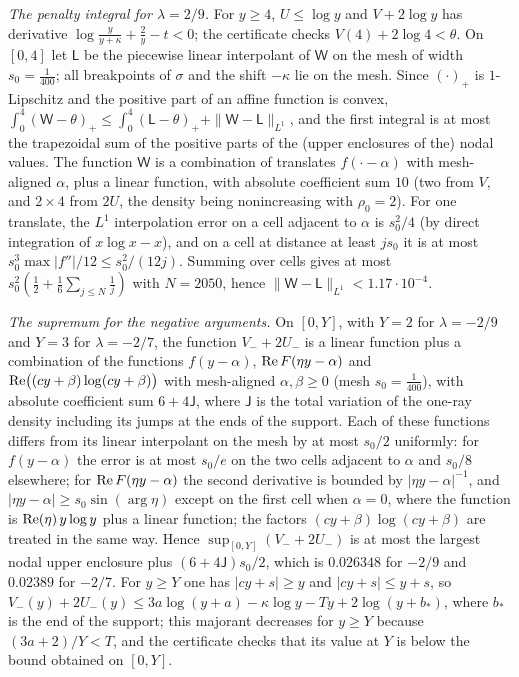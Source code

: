 \emph{The penalty integral for $\lambda=2/9$.} For $y\ge4$, $U\le\log y$ and $V+2\log y$ has derivative $\log\frac y{y+\kappa}+\frac2y-t<0$; the certificate checks $V(4)+2\log4<\theta$. On $[0,4]$ let $\mathsf L$ be the piecewise linear interpolant of $\mathsf W$ on the mesh of width $s_0=\frac1{400}$; all breakpoints of $\sigma$ and the shift $-\kappa$ lie on the mesh. Since $(\cdot)_+$ is $1$-Lipschitz and the positive part of an affine function is convex, $\int_0^4(\mathsf W-\theta)_+\le\int_0^4(\mathsf L-\theta)_++\|\mathsf W-\mathsf L\|_{L^1}$, and the first integral is at most the trapezoidal sum of the positive parts of the (upper enclosures of the) nodal values. The function $\mathsf W$ is a combination of translates $f(\cdot-\alpha)$ with mesh-aligned $\alpha$, plus a linear function, with absolute coefficient sum $10$ (two from $V$, and $2\times4$ from $2U$, the density being nonincreasing with $\rho_0=2$). For one translate, the $L^1$ interpolation error on a cell adjacent to $\alpha$ is $s_0^2/4$ (by direct integration of $x\log x-x$), and on a cell at distance at least $js_0$ it is at most $s_0^3\max|f''|/12\le s_0^2/(12j)$. Summing over cells gives at most $s_0^2(\frac12+\frac16\sum_{j\le N}\frac1j)$ with $N=2050$, hence $\|\mathsf W-\mathsf L\|_{L^1}<1.17\cdot10^{-4}$.

\emph{The supremum for the negative arguments.} On $[0,Y]$, with $Y=2$ for $\lambda=-2/9$ and $Y=3$ for $\lambda=-2/7$, the function $V_-+2U_-$ is a linear function plus a combination of the functions $f(y-\alpha)$, $\operatorname{Re} F(\eta y-\alpha)$ and $\operatorname{Re}\bigl((cy+\beta)\log(cy+\beta)\bigr)$ with mesh-aligned $\alpha,\beta\ge0$ (mesh $s_0=\frac1{400}$), with absolute coefficient sum $6+4\mathsf J$, where $\mathsf J$ is the total variation of the one-ray density including its jumps at the ends of the support. Each of these functions differs from its linear interpolant on the mesh by at most $s_0/2$ uniformly: for $f(y-\alpha)$ the error is at most $s_0/e$ on the two cells adjacent to $\alpha$ and $s_0/8$ elsewhere; for $\operatorname{Re} F(\eta y-\alpha)$ the second derivative is bounded by $|\eta y-\alpha|^{-1}$, and $|\eta y-\alpha|\ge s_0\sin(\arg\eta)$ except on the first cell when $\alpha=0$, where the function is $\operatorname{Re}(\eta)\,y\log y$ plus a linear function; the factors $(cy+\beta)\log(cy+\beta)$ are treated in the same way. Hence $\sup_{[0,Y]}(V_-+2U_-)$ is at most the largest nodal upper enclosure plus $(6+4\mathsf J)s_0/2$, which is $0.026348$ for $-2/9$ and $0.02389$ for $-2/7$. For $y\ge Y$ one has $|cy+s|\ge y$ and $|cy+s|\le y+s$, so $V_-(y)+2U_-(y)\le3a\log(y+a)-\kappa\log y-Ty+2\log(y+b_*)$, where $b_*$ is the end of the support; this majorant decreases for $y\ge Y$ because $(3a+2)/Y<T$, and the certificate checks that its value at $Y$ is below the bound obtained on $[0,Y]$.

